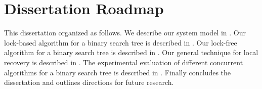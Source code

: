 \section{Dissertation Roadmap} 
This dissertation organized as follows. We describe our system model in . Our lock-based algorithm for a binary search tree is described in . Our lock-free algorithm for a binary search tree is described in . Our general technique for local recovery is described in . The experimental evaluation of different concurrent algorithms for a binary search tree is described in . Finally  concludes the dissertation and outlines directions for future research.